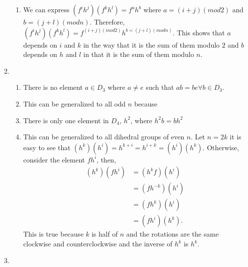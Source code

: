 \documentclass{article}
\begin{document}
\begin{enumerate}
\begin{enumerate}
        \item
        
        We can express $(f^ih^j)(f^kh^l)=f^ah^b$ where $a=(i+j)(mod 2)$ and $b=(j+l)(mod n)$. Therefore, $(f^ih^j)(f^kh^l)=f^{(i+j)(mod 2)}h^{b=(j+l)(mod n)}$. This shows that $a$ depends on $i$ and $k$ in the way that it is the sum of them modulo $2$ and $b$ depends on $h$ and $l$ in that it is the sum of them modulo $n$.
        
    \end{enumerate}
    \pagebreak 
    
    \item
    
    \begin{enumerate}
        \item 
        
        There is no element $a\in D_3$ where $a \neq e$ such that $ab=be \forall b\in D_3$.
        
        \item
        
        This can be generalized to all odd $n$ because 
        
        \item
        
        There is only one element in $D_4$, $h^2$, where $h^2 b= b h^2$
        
        \item
        
        This can be generalized to all dihedral groups of even $n$. Let $n=2k$ it is easy to see that $(h^k)(h^i)=h^{k+i}=h^{i+k}=(h^i)(h^k).$ Otherwise, consider the element $fh^i$, then,
        \begin{align*}
            (h^k)(fh^i) &= (h^kf)(h^i)\\
            &= (fh^{-k})(h^i)\\
            &= (fh^k)(h^i)\\
            &= (fh^i)(h^k).
        \end{align*} This is true because $k$ is half of $n$ and the rotations are the same clockwise and counterclockwise and the inverse of $h^k$ is $h^k$.
        
    \end{enumerate}
    \pagebreak 
    
    \item
    

\end{enumerate}
\end{document}
